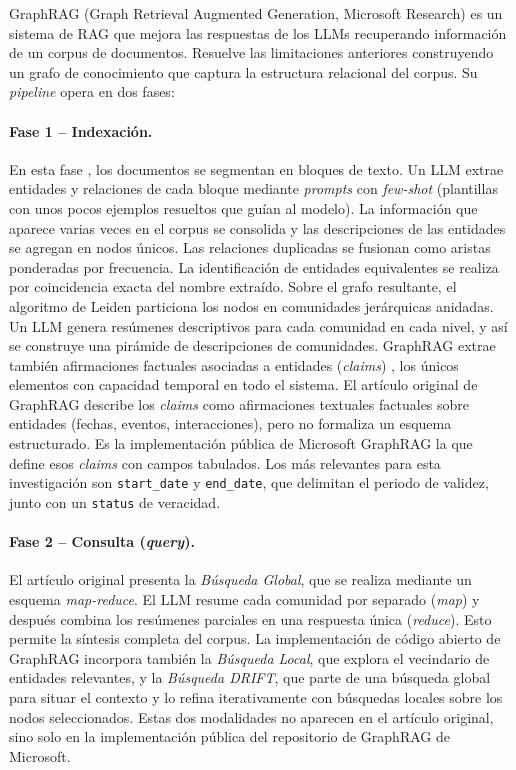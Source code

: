 GraphRAG (Graph Retrieval Augmented Generation, Microsoft Research) \cite{edge2024local} es un sistema de RAG que mejora las respuestas de los LLMs recuperando información de un corpus de documentos. Resuelve las limitaciones anteriores construyendo un grafo de conocimiento que captura la estructura relacional del corpus. Su \emph{pipeline} opera en dos fases:

\paragraph{Fase 1 -- Indexación.} En esta fase \cite{edge2024local}, los documentos se segmentan en bloques de texto. Un LLM extrae entidades y relaciones de cada bloque mediante \emph{prompts} con \emph{few-shot} (plantillas con unos pocos ejemplos resueltos que guían al modelo). La información que aparece varias veces en el corpus se consolida y las descripciones de las entidades se agregan en nodos únicos. Las relaciones duplicadas se fusionan como aristas ponderadas por frecuencia. La identificación de entidades equivalentes se realiza por coincidencia exacta del nombre extraído. Sobre el grafo resultante, el algoritmo de Leiden \cite{traag2019leiden} particiona los nodos en comunidades jerárquicas anidadas. Un LLM genera resúmenes descriptivos para cada comunidad en cada nivel, y así se construye una pirámide de descripciones de comunidades.
GraphRAG extrae también afirmaciones factuales asociadas a entidades (\emph{claims}) \cite{edge2024local}, los únicos elementos con capacidad temporal en todo el sistema. El artículo original de GraphRAG describe los \emph{claims} como afirmaciones textuales factuales sobre entidades (fechas, eventos, interacciones), pero no formaliza un esquema estructurado. Es la implementación pública de Microsoft GraphRAG la que define esos \emph{claims} con campos tabulados. Los más relevantes para esta investigación son \texttt{start\_date} y \texttt{end\_date}, que delimitan el periodo de validez, junto con un \texttt{status} de veracidad.

\paragraph{Fase 2 -- Consulta (\emph{query}).} El artículo original \cite{edge2024local} presenta la \emph{Búsqueda Global}, que se realiza mediante un esquema \emph{map-reduce}. El LLM resume cada comunidad por separado (\emph{map}) y después combina los resúmenes parciales en una respuesta única (\emph{reduce}). Esto permite la síntesis completa del corpus. La implementación de código abierto de GraphRAG incorpora también la \emph{Búsqueda Local}, que explora el vecindario de entidades relevantes, y la \emph{Búsqueda DRIFT}, que parte de una búsqueda global para situar el contexto y lo refina iterativamente con búsquedas locales sobre los nodos seleccionados. Estas dos modalidades no aparecen en el artículo original, sino solo en la implementación pública del repositorio de GraphRAG de Microsoft.

